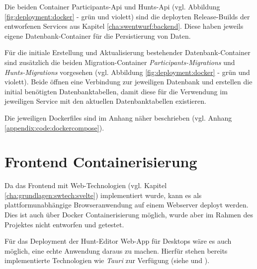 Die beiden Container Participants-Api und Hunts-Api (vgl. Abbildung \ref{fig:deployment:docker} - grün und violett) sind die deployten Release-Builds der entworfenen Services aus Kapitel \ref{cha:swentwurf:backend}. Diese haben jeweils eigene Datenbank-Container für die Persistierung von Daten.

Für die initiale Erstellung und Aktualisierung bestehender Datenbank-Container sind zusätzlich die beiden Migration-Container \textit{Participants-Migrations} und \textit{Hunts-Migrations} vorgesehen (vgl. Abbildung \ref{fig:deployment:docker} - grün und violett). Beide öffnen eine Verbindung zur jeweiligen Datenbank und erstellen die initial benötigten Datenbanktabellen, damit diese für die Verwendung im jeweiligen Service mit den aktuellen Datenbanktabellen existieren.

Die jeweiligen Dockerfiles sind im Anhang näher beschrieben (vgl. Anhang \ref{appendix:code:dockercompose}).

\section{Frontend Containerisierung}

Da das Frontend mit Web-Technologien (vgl. Kapitel \ref{cha:grundlagen:swtech:svelte}) implementiert wurde, kann es als plattformunabhängige Browseranwendung auf einem Webserver deployt werden. Dies ist auch über Docker Containerisierung möglich, wurde aber im Rahmen des Projektes nicht entworfen und getestet.

Für das Deployment der Hunt-Editor Web-App für Desktops wäre es auch möglich, eine echte Anwendung daraus zu machen. Hierfür stehen bereits implementierte Technologien wie \textit{Tauri} zur Verfügung (siehe \autocite{github:tauri} und \autocite{tauri:tauri}).
